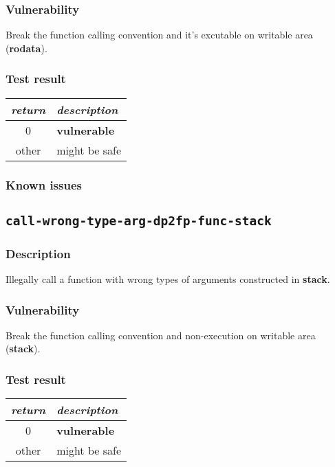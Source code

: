 \documentclass[a4paper]{book}
\begin{document}
\subsubsection{Vulnerability}
Break the function calling convention and it’s excutable on writable area (\textbf{rodata}).

\subsubsection{Test result}
\begin{tabular}{cl}
  \toprule
  \emph{return}  & \emph{description} \\
  \midrule
  0              & \textbf{vulnerable} \\
  other          & might be safe \\
  \bottomrule
\end{tabular}

\subsubsection{Known issues}

\newpage

\subsection{\texttt{call-wrong-type-arg-dp2fp-func-stack}}\label{test-call-wrong-type-arg-dp2fp-func-stack}

\subsubsection{Description}
Illegally call a function with wrong types of arguments constructed in \textbf{stack}.

\subsubsection{Vulnerability}
Break the function calling convention and non-execution on writable area (\textbf{stack}).

\subsubsection{Test result}
\begin{tabular}{cl}
  \toprule
  \emph{return}  & \emph{description} \\
  \midrule
  0              & \textbf{vulnerable} \\
  other          & might be safe \\
  \bottomrule
\end{tabular}
\end{document}
